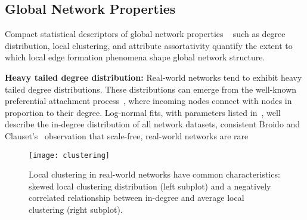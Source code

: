 %


\subsection{Global Network Properties}
\label{subsec:factors}

Compact statistical descriptors of global network properties ~\cite{newman2010networks}
such as degree distribution, local clustering, and attribute assortativity
quantify the extent to which local edge formation phenomena shape global network
structure.

\textbf{Heavy tailed degree distribution:}
Real-world networks tend to exhibit heavy tailed degree distributions.
These distributions can emerge from the well-known preferential attachment
process~\cite{simon1955class,barabasi1999emergence}, where incoming nodes
connect with nodes in proportion to their degree.
Log-normal fits, with parameters listed in~, well describe
the in-degree distribution of all network datasets, consistent Broido and
Clauset's~\cite{broido2018scale} observation that scale-free, real-world networks
are rare

\begin{figure}[b]
 \vspace{-10pt}
 \centering
 \texttt{[image: clustering]}
 \caption{
    Local clustering in real-world networks have common characteristics:
    skewed local clustering distribution (left subplot) and a negatively correlated
    relationship between in-degree and average local clustering (right subplot).
 }
 \label{fig:cc_dc}
 \vspace{-10pt}
\end{figure}

